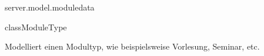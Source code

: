 \begin{texdocpackage}{server.model.moduledata}
\begin{texdocclass}{class}{ModuleType}
\label{texdoclet:edu.kit.informatik.studyplan.server.model.moduledata.ModuleType}
\begin{texdocclassintro}
Modelliert einen Modultyp, wie beispielsweise Vorlesung, Seminar, etc.\end{texdocclassintro}
\begin{texdocclassconstructors}
\end{texdocclassconstructors}
\begin{texdocclassmethods}
\end{texdocclassmethods}
\end{texdocclass}


\end{texdocpackage}



